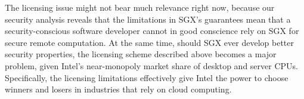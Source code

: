 The licensing issue might not bear much relevance right now, because our
security analysis reveals that the limitations in SGX's guarantees mean that a
security-conscious software developer cannot in good conscience rely on SGX for
secure remote computation. At the same time, should SGX ever develop better
security properties, the licensing scheme described above becomes a major
problem, given Intel's near-monopoly market share of desktop and server CPUs.
Specifically, the licensing limitations effectively give Intel the power to
choose winners and losers in industries that rely on cloud computing.
